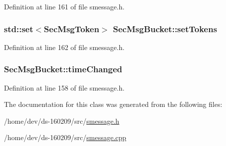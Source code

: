 Definition at line 161 of file smessage.\+h.

\hypertarget{class_sec_msg_bucket_af3c53d130f0f0e1851face20ecaa0ffc}{}
\subsubsection[{set\+Tokens}]{\setlength{\rightskip}{0pt plus 5cm}std\+::set$<${\bf Sec\+Msg\+Token}$>$ Sec\+Msg\+Bucket\+::set\+Tokens}\label{class_sec_msg_bucket_af3c53d130f0f0e1851face20ecaa0ffc}


Definition at line 162 of file smessage.\+h.

\hypertarget{class_sec_msg_bucket_a77b045448af083e17a200f042c6d9331}{}
\subsubsection[{time\+Changed}]{ Sec\+Msg\+Bucket\+::time\+Changed}\label{class_sec_msg_bucket_a77b045448af083e17a200f042c6d9331}


Definition at line 158 of file smessage.\+h.



The documentation for this class was generated from the following files\+:\begin{DoxyCompactItemize}
\item 
/home/dev/ds-\/160209/src/\hyperlink{smessage_8h}{smessage.\+h}\item 
/home/dev/ds-\/160209/src/\hyperlink{smessage_8cpp}{smessage.\+cpp}\end{DoxyCompactItemize}
